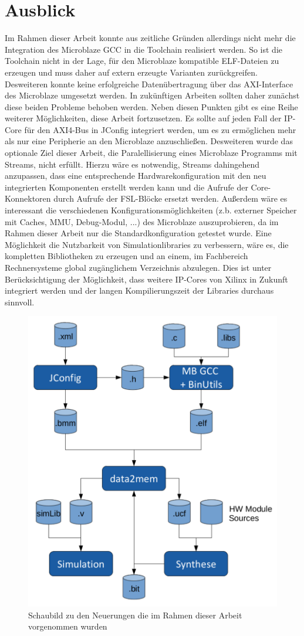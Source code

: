 \section{Ausblick}
Im Rahmen dieser Arbeit konnte aus zeitliche Gründen allerdings nicht mehr die Integration des Microblaze GCC in die Toolchain realisiert werden. So ist die Toolchain nicht in der Lage, für den Microblaze kompatible ELF-Dateien zu erzeugen und muss daher auf extern erzeugte Varianten zurückgreifen. Desweiteren konnte keine erfolgreiche Datenübertragung über das AXI-Interface des Microblaze umgesetzt werden. In zukünftigen Arbeiten sollten daher zunächst diese beiden Probleme behoben werden. Neben diesen Punkten gibt es eine Reihe weiterer Möglichkeiten, diese Arbeit fortzusetzen. Es sollte auf jeden Fall der IP-Core für den AXI4-Bus in JConfig integriert werden, um es zu ermöglichen mehr als nur eine Peripherie an den Microblaze anzuschließen. Desweiteren wurde das optionale Ziel dieser Arbeit, die Paralellisierung eines Microblaze Programms mit \textmu\/Streams, nicht erfüllt. Hierzu wäre es notwendig, \textmu\/Streams dahingehend anzupassen, dass eine entsprechende Hardwarekonfiguration mit den neu integrierten Komponenten erstellt werden kann und die Aufrufe der Core-Konnektoren durch Aufrufe der FSL-Blöcke ersetzt werden. Außerdem wäre es interessant die verschiedenen Konfigurationsmöglichkeiten (z.b. externer Speicher mit Caches, MMU, Debug-Modul, ...) des Microblaze auszuprobieren, da im Rahmen dieser Arbeit nur die Standardkonfiguration getestet wurde. Eine Möglichkeit die Nutzbarkeit von Simulationlibraries zu verbessern, wäre es, die kompletten Bibliotheken zu erzeugen und an einem, im Fachbereich Rechnersysteme global zugänglichem Verzeichnis abzulegen. Dies ist unter Berücksichtigung der Möglichkeit, dass weitere IP-Cores von Xilinx in Zukunft integriert werden und der langen Kompilierungszeit der Libraries durchaus sinnvoll.
\begin{figure}
\centering
\includegraphics[width=0.8\linewidth, height=0.8\linewidth]{./bilder/Schaubild}
\caption{Schaubild zu den Neuerungen die im Rahmen dieser Arbeit vorgenommen wurden}
\label{fig:Schaubild}
\end{figure}